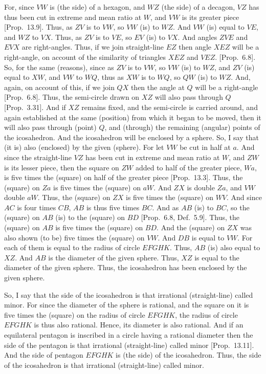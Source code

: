 \begin{Parallel}{}{}
{For, since $VW$ is (the side) of a hexagon, and $WZ$ (the side) of
a decagon, $VZ$ has thus been cut in extreme and mean
ratio at $W$, and $VW$ is its greater piece  [Prop.~13.9]. Thus, as
$ZV$ is to $VW$, so $VW$ (is) to $WZ$. And $VW$ (is) equal
to $VE$, and $WZ$ to $VX$.  Thus, as $ZV$ is to $VE$,
so $EV$ (is) to $VX$. And angles $ZVE$ and
$EVX$ are right-angles. Thus, if we join straight-line $EZ$ then angle
$XEZ$ will be a right-angle, on account of the similarity of triangles
$XEZ$ and $VEZ$.  [Prop.~6.8]. So, for the same (reasons), since
as $ZV$ is to $VW$, so $VW$ (is) to $WZ$,  and $ZV$ (is) equal to
$XW$, and $VW$ to $WQ$, thus as $XW$ is to $WQ$, so $QW$
(is) to $WZ$. And, again, on account of this,  if we join $QX$ then the
angle at $Q$ will be a right-angle [Prop.~6.8]. Thus, the semi-circle
drawn on $XZ$ will also pass through $Q$ [Prop.~3.31]. And if $XZ$ remains
fixed, and the semi-circle is carried around, and again established at
the same (position) from which it began to be moved, then it will
also pass through (point) $Q$, and (through) the remaining (angular) points
of the icosahedron. And the icosahedron will be enclosed by a sphere.
 So, I say that (it is) also (enclosed) by the given (sphere). 
 For let $VW$ be cut in half at $a$. And since the straight-line $VZ$ has been cut in extreme and mean ratio at $W$, and  $ZW$ is its lesser piece,
 then the square on $ZW$ added to half of the greater piece, $Wa$, is
 five times the (square) on half of the greater piece [Prop.~13.3]. 
 Thus, the (square) on $Za$ is five times the (square) on $aW$. And
 $ZX$ is double $Za$, and $VW$ double $aW$. Thus,
 the (square) on $ZX$ is five times the (square) on $WV$. And since
 $AC$ is four times $CB$, $AB$ is thus five times $BC$. And as
 $AB$ (is) to $BC$, so the (square) on $AB$ (is) to the
 (square) on $BD$ [Prop.~6.8, Def.~5.9]. Thus, the (square)
 on $AB$ is five times the (square) on $BD$. And the (square) on 
 $ZX$ was also shown (to be) five times the (square) on $VW$. 
 And $DB$ is equal to $VW$. For each of them is equal to the
 radius of circle $EFGHK$.  Thus, $AB$ (is) also equal to
 $XZ$.  And $AB$ is the diameter of the given sphere. Thus,
 $XZ$ is equal to the diameter of the given sphere. Thus, the icosahedron
 has been enclosed by the given sphere.
 
 So, I say that the side of the icosahedron is that irrational (straight-line)
 called minor. For since the diameter of the sphere is rational, and the
 square on it is five times the (square) on the radius of circle
 $EFGHK$, the radius of circle $EFGHK$ is thus also rational.
 Hence, its diameter is also rational. And if an equilateral
 pentagon is inscribed in a circle having a rational diameter then
 the side of the pentagon is that irrational (straight-line) called minor [Prop.~13.11]. And the side of pentagon $EFGHK$ is (the side)
 of the icosahedron. Thus, the side of the icosahedron is that irrational
 (straight-line) called minor.}
\end{Parallel}

